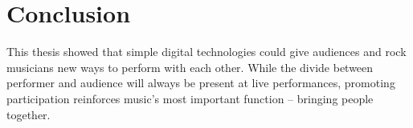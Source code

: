 \section{Conclusion}

This thesis showed that simple digital technologies could give audiences and rock musicians new ways to perform with each other. While the divide between performer and audience will always be present at live performances, promoting participation reinforces music's most important function -- bringing people together.
